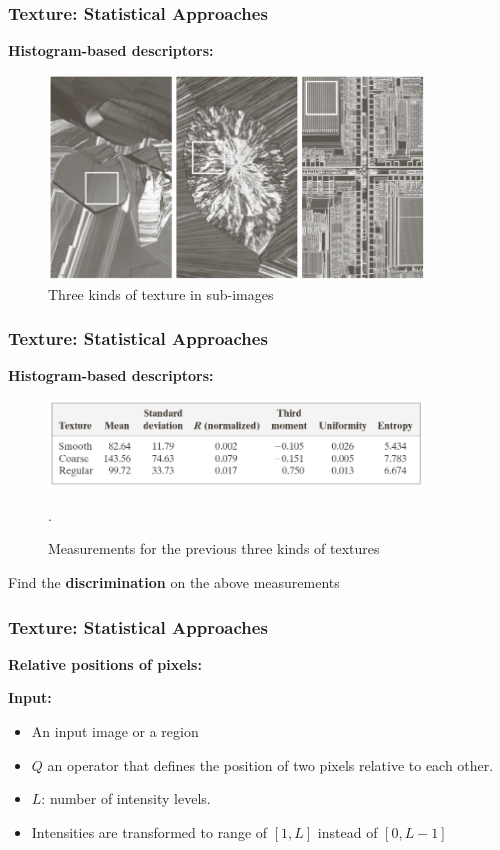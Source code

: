 \documentclass[english,11pt,table,handout]{beamer}
\begin{document}
\frame
{
	\frametitle{Texture: Statistical Approaches}
	\large
	\textbf{Histogram-based descriptors: }
	\newline
	
	\begin{figure}[!h]
		\includegraphics[width=10cm]{texture_1.png}
		\caption{Three kinds of texture in sub-images}
	\end{figure}
	
}
\frame
{
	\frametitle{Texture: Statistical Approaches}
	\large
	\textbf{Histogram-based descriptors: }
	\newline
	
	\begin{figure}[!h]
		\includegraphics[width=10cm]{texture_2.png}
		\caption{Measurements for the previous three kinds of textures}. 
	\end{figure}
	Find the \textbf{discrimination} on the above measurements
	
}

\frame
{
	\frametitle{Texture: Statistical Approaches}
	\large
	\textbf{Relative positions of pixels: }
	\newline
	
	\textbf{Input:}
	\begin{itemize}
		\item An input image or a region
		\item $Q$ an operator that defines the position of two pixels relative to each other.
		\item $L$: number of intensity levels.
		\item \alert{Intensities are transformed to range of $[1, L]$ instead of $[0, L-1]$}
	\end{itemize}
	
}
\end{document}
